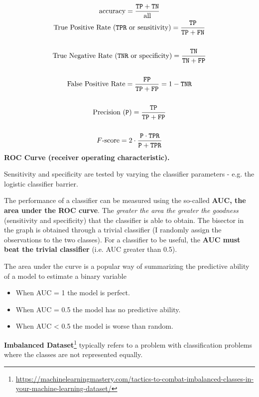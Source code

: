 \begin{gather*}
    \text{accuracy} =\frac{\texttt{TP}+\texttt{TN}}{\text{all}}\\
    \text{True Positive Rate (\texttt{TPR} or sensitivity)} =\frac{\texttt{TP}}{\texttt{TP}+\texttt{FN}}\\
    \\
    \text{True Negative Rate (\texttt{TNR} or specificity)} =\frac{\texttt{TN}}{\texttt{TN}+\texttt{FP}}\\
    \\
    \text{False Positive Rate} =\frac{\texttt{FP}}{\texttt{TP}+\texttt{FP}} = 1 - \texttt{TNR}\\
    \\
    \text{Precision (\texttt{P})} = \frac{\texttt{TP}}{\texttt{TP}+\texttt{FP}}\\
    \\
    F\text{-score} = 2 \cdot \frac{\texttt{P} \cdot \texttt{TPR}}{\texttt{P} + \texttt{TPR}}
\end{gather*}
\textbf{ROC Curve (receiver operating characteristic).}

Sensitivity and specificity are tested by varying the classifier parameters - e.g. the logistic classifier barrier.


The performance of a classifier can be measured using the so-called \textbf{AUC, the area under the ROC curve}. The \textit{greater the area the greater the goodness} (sensitivity and specificity) that the classifier is able to obtain. The bisector in the graph is obtained through a trivial classifier (I randomly assign the observations to the two classes). For a classifier to be useful, the \textbf{AUC must beat the trivial classifier} (i.e. AUC greater than 0.5).

The area under the curve is a popular way of summarizing the predictive ability of a model to estimate a binary variable
\begin{itemize}
    \item When AUC = 1 the model is perfect. 
    \item When AUC = 0.5 the model has no predictive ability.
    \item When AUC < 0.5 the model is worse than random.
\end{itemize}

\textbf{Imbalanced Dataset}\footnote{\url{https://machinelearningmastery.com/tactics-to-combat-imbalanced-classes-in-your-machine-learning-dataset/}} typically refers to a problem with classification problems where the classes are not represented equally.


